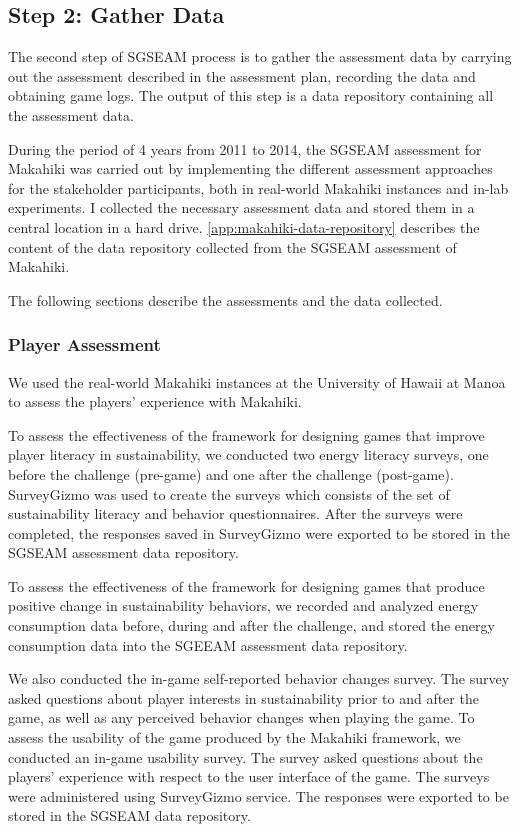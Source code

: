 \subsection{Step 2: Gather Data}

The second step of SGSEAM process is to gather the assessment data by carrying out the assessment described in the assessment plan, recording the data and obtaining game logs. The output of this step is a data repository containing all the assessment data. 

During the period of 4 years from 2011 to 2014, the SGSEAM assessment for Makahiki was carried out by implementing the different assessment approaches for the stakeholder participants, both in real-world Makahiki instances and in-lab experiments. I collected the necessary assessment data and stored them in a central location in a hard drive. \autoref{app:makahiki-data-repository} describes the content of the data repository collected from the SGSEAM assessment of Makahiki. 

The following sections describe the assessments and the data collected. 

\subsubsection{Player Assessment}

We used the real-world Makahiki instances at the University of Hawaii at Manoa to assess the players' experience with Makahiki. 

To assess the effectiveness of the framework for designing games that improve player literacy in sustainability, we
conducted two energy literacy surveys, one before the challenge (pre-game) and one after
the challenge (post-game). SurveyGizmo was used to create the surveys which consists of the set of sustainability literacy and behavior questionnaires. 
After the surveys were completed, the responses saved in SurveyGizmo were exported to be stored in the SGSEAM assessment data repository.

To assess the effectiveness of the framework for designing games that produce positive change in sustainability
behaviors, we recorded and analyzed energy consumption data before, during and after the
challenge, and stored the energy consumption data into the SGEEAM assessment data repository. 

We also conducted the in-game self-reported behavior changes survey. The survey asked questions about player interests in sustainability prior to and after the game, as well as any perceived behavior changes when playing the game.  To assess the usability of the game produced by the Makahiki framework, we conducted an in-game usability survey. The survey asked questions about the players' experience with respect to the user interface of the game. The surveys were administered using SurveyGizmo service. The responses were exported to be stored in the SGSEAM data repository.

